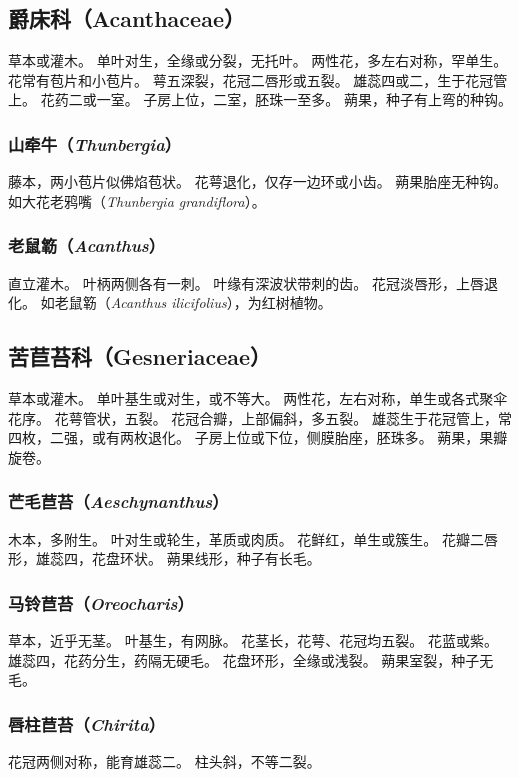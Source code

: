 \documentclass[11pt]{article}
\begin{document}
\begin{sloppypar}
\subsection{爵床科（Acanthaceae）}
草本或灌木。
单叶对生，全缘或分裂，无托叶。
两性花，多左右对称，罕单生。
花常有苞片和小苞片。
萼五深裂，花冠二唇形或五裂。
雄蕊四或二，生于花冠管上。
花药二或一室。
子房上位，二室，胚珠一至多。
蒴果，种子有上弯的种钩。

\subsubsection{山牵牛（\textit{Thunbergia}）}
藤本，两小苞片似佛焰苞状。
花萼退化，仅存一边环或小齿。
蒴果胎座无种钩。
如大花老鸦嘴（\textit{Thunbergia grandiflora}）。

\subsubsection{老鼠簕（\textit{Acanthus}）}
直立灌木。
叶柄两侧各有一刺。
叶缘有深波状带刺的齿。
花冠淡唇形，上唇退化。
如老鼠簕（\textit{Acanthus ilicifolius}），为红树植物。

\subsection{苦苣苔科（Gesneriaceae）}
草本或灌木。
单叶基生或对生，或不等大。
两性花，左右对称，单生或各式聚伞花序。
花萼管状，五裂。
花冠合瓣，上部偏斜，多五裂。
雄蕊生于花冠管上，常四枚，二强，或有两枚退化。
子房上位或下位，侧膜胎座，胚珠多。
蒴果，果瓣旋卷。

\subsubsection{芒毛苣苔（\textit{Aeschynanthus}）}
木本，多附生。
叶对生或轮生，革质或肉质。
花鲜红，单生或簇生。
花瓣二唇形，雄蕊四，花盘环状。
蒴果线形，种子有长毛。

\subsubsection{马铃苣苔（\textit{Oreocharis}）}
草本，近乎无茎。
叶基生，有网脉。
花茎长，花萼、花冠均五裂。
花蓝或紫。
雄蕊四，花药分生，药隔无硬毛。
花盘环形，全缘或浅裂。
蒴果室裂，种子无毛。

\subsubsection{唇柱苣苔（\textit{Chirita}）}
花冠两侧对称，能育雄蕊二。
柱头斜，不等二裂。


\end{sloppypar}
\end{document}
